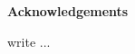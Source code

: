 \noindent
{\LARGE\textbf{Acknowledgements}}
\vspace{1cm}

\begin{spacing}{1} 
\noindent
write ...


\end{spacing}

